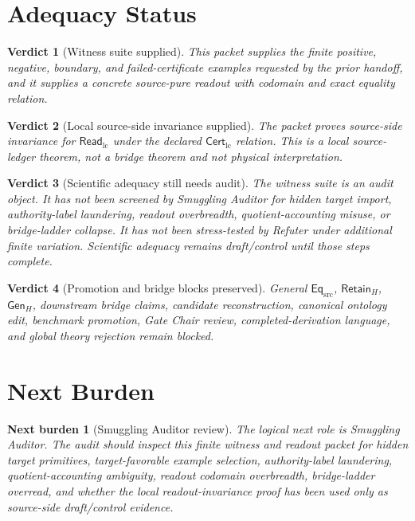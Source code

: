 \documentclass[11pt]{article}
\newcommand{\EqSrc}{\mathsf{Eq}_{\mathrm{src}}}
\newcommand{\CertLC}{\mathsf{Cert}_{\mathrm{lc}}}
\newcommand{\ReadLC}{\mathsf{Read}_{\mathrm{lc}}}
\newcommand{\RetainH}{\mathsf{Retain}_{H}}
\newcommand{\GenH}{\mathsf{Gen}_{H}}
\newtheorem{verdict}{Verdict}
\newtheorem{nextburden}{Next burden}
\begin{document}
\section{Adequacy Status}

\begin{verdict}[Witness suite supplied]
This packet supplies the finite positive, negative, boundary, and
failed-certificate examples requested by the prior handoff, and it
supplies a concrete source-pure readout with codomain and exact equality
relation.
\end{verdict}

\begin{verdict}[Local source-side invariance supplied]
The packet proves source-side invariance for \(\ReadLC\) under the
declared \(\CertLC\) relation. This is a local source-ledger theorem,
not a bridge theorem and not physical interpretation.
\end{verdict}

\begin{verdict}[Scientific adequacy still needs audit]
The witness suite is an audit object. It has not been screened by
Smuggling Auditor for hidden target import, authority-label laundering,
readout overbreadth, quotient-accounting misuse, or bridge-ladder
collapse. It has not been stress-tested by Refuter under additional
finite variation. Scientific adequacy remains draft/control until those
steps complete.
\end{verdict}

\begin{verdict}[Promotion and bridge blocks preserved]
General \(\EqSrc\), \(\RetainH\), \(\GenH\), downstream bridge claims,
candidate reconstruction, canonical ontology edit, benchmark promotion,
Gate Chair review, completed-derivation language, and global theory
rejection remain blocked.
\end{verdict}

\section{Next Burden}

\begin{nextburden}[Smuggling Auditor review]
The logical next role is Smuggling Auditor. The audit should inspect
this finite witness and readout packet for hidden target primitives,
target-favorable example selection, authority-label laundering,
quotient-accounting ambiguity, readout codomain overbreadth,
bridge-ladder overread, and whether the local readout-invariance proof
has been used only as source-side draft/control evidence.
\end{nextburden}
\end{document}
